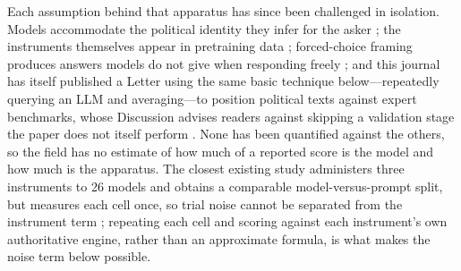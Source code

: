 \documentclass[11pt]{article}
\begin{document}
Each assumption behind that apparatus has since been challenged in
isolation. Models accommodate the political identity they infer for the
asker \citep{tornberg2026sycophancy}; the instruments themselves appear in
pretraining data \citep{bianchi2026plasticity}; forced-choice framing
produces answers models do not give when responding freely
\citep{rottger2024}; and this journal has itself published a Letter using
the same basic technique below---repeatedly querying an LLM and
averaging---to position political texts against expert benchmarks, whose
Discussion advises readers against skipping a validation stage the paper
does not itself perform \citep{lemens2025asking}. None has been quantified
against the others, so
the field has no estimate of how much of a reported score is the model and
how much is the apparatus. The closest existing study administers three
instruments to 26 models and obtains a comparable model-versus-prompt split,
but measures each cell once, so trial noise cannot be separated from the
instrument term \citep{sakhawat2026polalign}; repeating each cell and
scoring against each instrument's own authoritative engine, rather than an
approximate formula, is what makes the noise term below possible.
\end{document}
